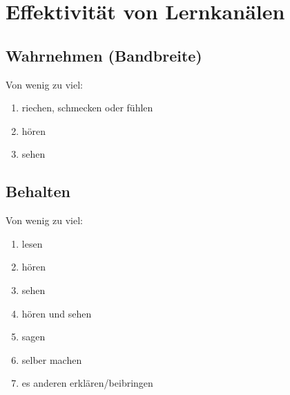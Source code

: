 \section{Effektivität von Lernkanälen}
\label{lernkanaele}

\subsection{Wahrnehmen (Bandbreite)}
Von wenig zu viel:
\begin{enumerate}
  \item riechen, schmecken oder fühlen
  \item hören
  \item sehen
\end{enumerate}

\subsection{Behalten}
Von wenig zu viel:
\begin{enumerate}
  \item lesen
  \item hören
  \item sehen
  \item hören und sehen
  \item sagen
  \item selber machen
  \item es anderen erklären/beibringen
\end{enumerate}
